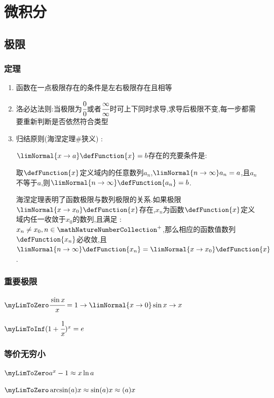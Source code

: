 \section{微积分}{

\subsection{极限}{

  \subsubsection{定理}{
    \begin{enumerate}
      \item 函数在一点极限存在的条件是左右极限存在且相等
      \item 洛必达法则:当极限为$\cfrac{0}{0}$或者$\cfrac{\infty}{\infty}$时可上下同时求导,求导后极限不变,每一步都需要重新判断是否依然符合类型
      \item {
            归结原则(海涅定理\#狭义) :

            $\limNormal{x \to a}\defFunction{x} = b$存在的充要条件是:

            取$\defFunction{x}$定义域内的任意数列${a_n}$,$\limNormal{n \to \infty}a_n = a$,且$a_n$不等于$a$,则$\limNormal{n \to \infty}\defFunction{a_n} = b$.

            海涅定理表明了函数极限与数列极限的关系.如果极限$\limNormal{x \to x_0}\defFunction{x}$存在,${x_n}$为函数$\defFunction{x}$定义域内任一收敛于$x_0$的数列,且满足 : $x_n \neq x_0,n \in \mathNatureNumberCollection^+$,那么相应的函数值数列${\defFunction{x_n}}$必收敛,且$\limNormal{n \to \infty}\defFunction{x_n} = \limNormal{x \to x_0}\defFunction{x}$.
            }
    \end{enumerate}
  }%

  \subsubsection{重要极限}{
    $\myLimToZero\cfrac{\sin{x}}{x}=1 \to \limNormal{x \to 0}\sin{x} \to x$

    $\myLimToInf(1+\cfrac{1}{x})^x = e$
  }%

  \subsubsection{等价无穷小}{
    $\myLimToZero a^x - 1 \approx x\ln{a}$

    $\myLimToZero \arcsin(a)x \approx \sin(a)x \approx (a)x$

}}}
